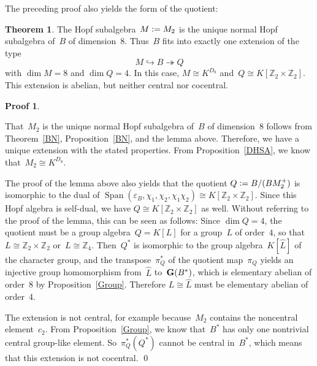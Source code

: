 \documentclass{article}
\newcounter{num}
\newenvironment{pflist}{\begin{list}{(\arabic{num})}{\usecounter{num} \leftmargin0cm \itemindent5pt}}{\end{list}}
\newcounter{num1}
\numberwithin{equation}{section}
\theoremstyle{definition}
\newtheorem*{pf}{Proof}
\newtheorem*{thm}{Theorem}
\theoremstyle{break}
\newcommand{\dm}{\operatorname{dim}}
\newcommand{\Span}{\operatorname{Span}}
\newcommand{\deq}{\vcentcolon =}
\newcommand{\1}{{(1)}}
\newcommand{\2}{{(2)}}
\newcommand{\3}{{(3)}}
\newcommand{\eb}{{\varepsilon_{B}}}
\newcommand{\Z}{{\mathbb Z}}
\begin{document}
The preceding proof also yields the form of the quotient:
\begin{thm}
The Hopf subalgebra~$M \deq M_2$ is the unique normal Hopf subalgebra of~$B$ of dimension~$8$. Thus~$B$ fits into exactly one extension of the type
\[M \hookrightarrow B \twoheadrightarrow Q\]
with $\dm M = 8$ and $\dm Q = 4$. In this case, $M \cong K^{D_8}$
and~$Q \cong K[\Z_2 \times \Z_2]$. This extension is abelian, but neither central nor cocentral.
\end{thm}
\begin{pf}
\begin{pflist}
\item
That~$M_2$ is the unique normal Hopf subalgebra of~$B$ of dimension~$8$ follows from Theorem~\ref{BN}, Proposition~\ref{BN}, and the lemma above. Therefore, we have a unique extension with the stated properties. From Proposition~\ref{DHSA}, we know
that~$M_2 \cong K^{D_8}$.

\item
The proof of the lemma above also yields that the quotient \mbox{$Q \deq B/(B M_2^+)$} is isomorphic to the dual of
$\Span(\eb, \chi_1, \chi_2, \chi_1 \chi_2) \cong K[\Z_2 \times \Z_2]$. Since this Hopf algebra is self-dual, we have \mbox{$Q \cong K[\Z_2 \times \Z_2]$} as well. Without referring to the proof of the lemma, this can be seen as follows: Since $\dm Q = 4$, the quotient must be a group algebra~$Q=K[L]$ for a group~$L$ of order~$4$, so that~$L \cong \Z_2 \times \Z_2$ or~$L \cong \Z_4$. Then~$Q^*$ is isomorphic to the group algebra~$K[\hat{L}]$ of the character group, and the transpose~$\pi_Q^*$ of the quotient map~$\pi_Q$ yields an injective group homomorphism from~$\hat{L}$ to~${\bf G}(B^*)$, which is elementary abelian of order~$8$ by Proposition~\ref{Group}. Therefore $L \cong \hat{L}$ must be elementary abelian of order~$4$.

\item
The extension is not central, for example because~$M_2$ contains the noncentral element~$c_2$.
From Proposition~\ref{Group}, we know that~$B^*$ has only one nontrivial central group-like element. So~$\pi_Q^*(Q^*)$ cannot be central in~$B^*$, which means that this extension is not cocentral.
\qed
\end{pflist}
\end{pf}
\end{document}
